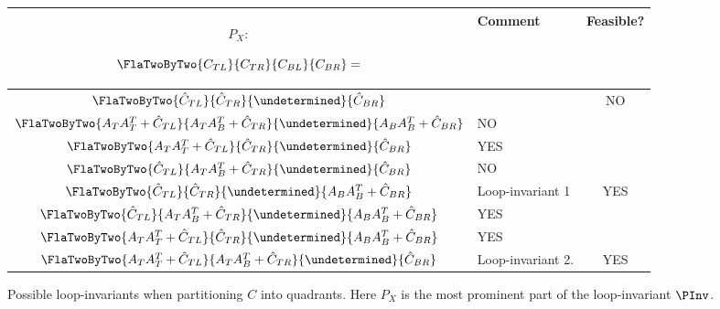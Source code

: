 \begin{figure}
\begin{center}
\footnotesize
{
\setlength{\tabcolsep}{4pt}
\begin{tabular}{| c | p{2.5in} | c | } \hline
$ P_X: $

$ \FlaTwoByTwo{ C_{TL} } { C_{TR} }
              { C_{BL} } { C_{BR} } =  $ & Comment &
\footnotesize Feasible? \\ \hline \hline
\footnotesize
$
\FlaTwoByTwo{ \hat{C}_{TL} }  { \hat{C}_{TR} }
            { \undetermined } { \hat{C}_{BR} }
$ 
&
&
NO
\\ \hline
%
%
\footnotesize
$
\FlaTwoByTwo{ A_{T} A_{T}^T + \hat{C}_{TL} }  { A_{T} A_{B}^T + \hat{C}_{TR} }
            { \undetermined }                 { A_{B} A_{B}^T + \hat{C}_{BR} }
$ 
& 
NO
\\ \hline
%
%
\footnotesize
$
\FlaTwoByTwo{ A_{T} A_{T}^T + \hat{C}_{TL} }  { \hat{C}_{TR} }
            { \undetermined }                 { \hat{C}_{BR} }
$ 
& 
YES
\\ \hline
%
%
\footnotesize
$
\FlaTwoByTwo{ \hat{C}_{TL} }  { A_{T} A_{B}^T + \hat{C}_{TR} } 
            { \undetermined } { \hat{C}_{BR} }
$ 
&
NO
\\ \hline
%
%
\footnotesize
$
\FlaTwoByTwo{ \hat{C}_{TL} }   { \hat{C}_{TR} }
            { \undetermined }  { A_{B} A_{B}^T + \hat{C}_{BR} }
$ 
&
Loop-invariant 1
&
YES
\\ \hline
%
%
\footnotesize
$
\FlaTwoByTwo{ \hat{C}_{TL} } { A_{T} A_{B}^T + \hat{C}_{TR} }
            { \undetermined} { A_{B} A_{B}^T + \hat{C}_{BR} }
$ 
&
YES
\\ \hline
%
%
\footnotesize
$
\FlaTwoByTwo{ A_{T} A_{T}^T + \hat{C}_{TL} } { \hat{C}_{TR} }
            { \undetermined }                { A_{B} A_{B}^T + \hat{C}_{BR} }
$ 
&
YES
\\ \hline
%
%
\footnotesize
$
\FlaTwoByTwo{ A_{T} A_{T}^T + \hat{C}_{TL} } { A_{T} A_{B}^T + \hat{C}_{TR} }
            { \undetermined }                { \hat{C}_{BR} }
$ 
&
Loop-invariant 2.
&
YES
\\ \hline
%
%
\end{tabular}
}
\end{center}
\caption{Possible loop-invariants when partitioning
$ C $ into quadrants.
Here $ P_X $ is the most prominent part of the loop-invariant
$ \PInv $.}
\label{fig:USYRK_UNN_example}
\end{figure}
